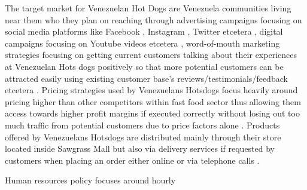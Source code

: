 The target market for Venezuelan Hot Dogs are Venezuela communities living near them who they plan on reaching through advertising campaigns focusing on social media platforms like Facebook , Instagram , Twitter etcetera , digital campaigns focusing on Youtube videos etcetera , word-of-mouth marketing strategies focusing on getting current customers talking about their experiences at Venezuelan Hots dogs positively so that more potential customers can be attracted easily using existing customer base's reviews/testimonials/feedback etcetera . Pricing strategies used by Venezuelans Hotsdogs focus heavily around pricing higher than other competitors within fast food sector thus allowing them access towards higher profit margins if executed correctly without losing out too much traffic from potential customers due to price factors alone . Products offered by Venezuelans Hotsdogs are distributed mainly through their store located inside Sawgrass Mall but also via delivery services if requested by customers when placing an order either online or via telephone calls .  

 Human resources policy focuses around hourly